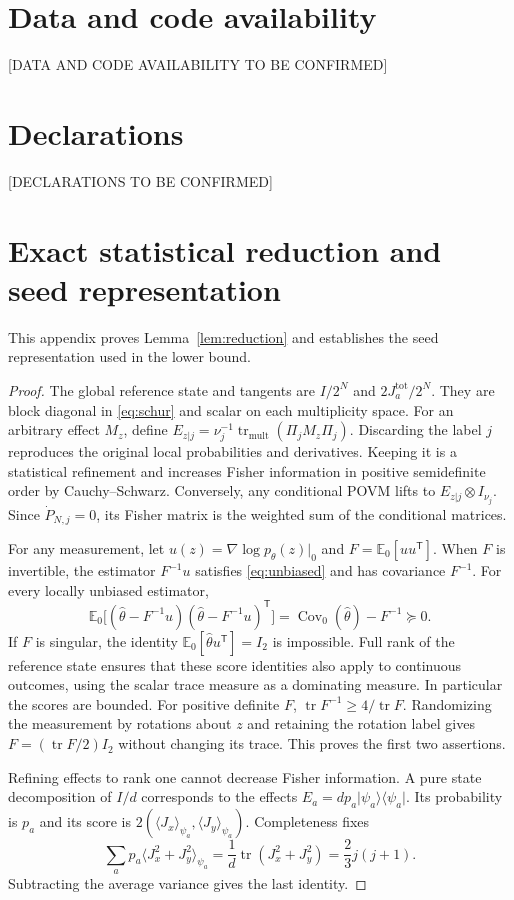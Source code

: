 \documentclass[aps,pra,reprint,superscriptaddress,longbibliography]{revtex4-2}
\theoremstyle{remark}
\DeclareMathOperator{\tr}{tr}
\DeclareMathOperator{\Cov}{Cov}
\newcommand{\E}{\mathbb E}
\newcommand{\ket}[1]{\lvert#1\rangle}
\newcommand{\bra}[1]{\langle#1\rvert}
\newcommand{\ip}[1]{\langle#1\rangle}
\begin{document}
\section*{Data and code availability}
[DATA AND CODE AVAILABILITY TO BE CONFIRMED]

\begin{acknowledgments}
\end{acknowledgments}

\section*{Declarations}
[DECLARATIONS TO BE CONFIRMED]

\appendix
\section{Exact statistical reduction and seed representation}
\label{app:reduction}
This appendix proves Lemma~\ref{lem:reduction} and establishes
the seed representation used in the lower bound.
\begin{proof}
The global reference state and tangents are $I/2^N$ and
$2J_a^{\mathrm{tot}}/2^N$. They are block diagonal in
\eqref{eq:schur} and scalar on each multiplicity space. For an
arbitrary effect $M_z$, define
$E_{z|j}=\nu_j^{-1}\tr_{\mathrm{mult}}(\Pi_jM_z\Pi_j)$.
Discarding the label $j$ reproduces the original local probabilities
and derivatives. Keeping it is a statistical refinement and increases
Fisher information in positive semidefinite order by
Cauchy--Schwarz. Conversely, any conditional POVM lifts to
$E_{z|j}\otimes I_{\nu_j}$. Since $\dot P_{N,j}=0$, its Fisher matrix
is the weighted sum of the conditional matrices.

For any measurement, let $u(z)=\nabla\log p_\theta(z)|_0$ and
$F=\E_0[uu^{\mathsf T}]$. When $F$ is invertible, the estimator
$F^{-1}u$ satisfies \eqref{eq:unbiased} and has covariance $F^{-1}$.
For every locally unbiased estimator,
\[
 \E_0\bigl[(\widehat\theta-F^{-1}u)
 (\widehat\theta-F^{-1}u)^{\mathsf T}\bigr]
 =\Cov_0(\widehat\theta)-F^{-1}\succeq0.
\]
If $F$ is singular, the identity
$\E_0[\widehat\theta u^{\mathsf T}]=I_2$ is impossible.
Full rank of the reference state ensures that these score identities
also apply to continuous outcomes, using the scalar trace measure as
a dominating measure. In particular the scores are bounded.
For positive definite $F$, $\tr F^{-1}\geq4/\tr F$.
Randomizing the measurement by rotations about $z$ and retaining the
rotation label gives $F=(\tr F/2)I_2$ without changing its trace.
This proves the first two assertions.

Refining effects to rank one cannot decrease Fisher information.
A pure state decomposition of $I/d$ corresponds to the effects
$E_a=dp_a\ket{\psi_a}\bra{\psi_a}$. Its probability is $p_a$ and its
score is $2(\ip{J_x}_{\psi_a},\ip{J_y}_{\psi_a})$. Completeness fixes
\[
 \sum_a p_a\ip{J_x^2+J_y^2}_{\psi_a}
 =\frac1d\tr(J_x^2+J_y^2)=\frac23j(j+1).
\]
Subtracting the average variance gives the last identity.
\end{proof}
\end{document}
